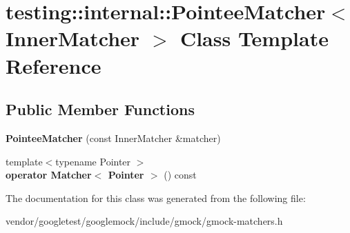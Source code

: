 \hypertarget{classtesting_1_1internal_1_1PointeeMatcher}{}\section{testing\+:\+:internal\+:\+:Pointee\+Matcher$<$ Inner\+Matcher $>$ Class Template Reference}
\label{classtesting_1_1internal_1_1PointeeMatcher}
\subsection*{Public Member Functions}
\begin{DoxyCompactItemize}
\item 
{\bfseries Pointee\+Matcher} (const Inner\+Matcher \&matcher)\hypertarget{classtesting_1_1internal_1_1PointeeMatcher_ad9f7d9dbd115c50811ce82ba27f1ba56}{}\label{classtesting_1_1internal_1_1PointeeMatcher_ad9f7d9dbd115c50811ce82ba27f1ba56}

\item 
{\footnotesize template$<$typename Pointer $>$ }\\{\bfseries operator Matcher$<$ Pointer $>$} () const \hypertarget{classtesting_1_1internal_1_1PointeeMatcher_a3a96cad4ee9e684ff11023ff35c7551b}{}\label{classtesting_1_1internal_1_1PointeeMatcher_a3a96cad4ee9e684ff11023ff35c7551b}

\end{DoxyCompactItemize}


The documentation for this class was generated from the following file\+:\begin{DoxyCompactItemize}
\item 
vendor/googletest/googlemock/include/gmock/gmock-\/matchers.\+h\end{DoxyCompactItemize}
